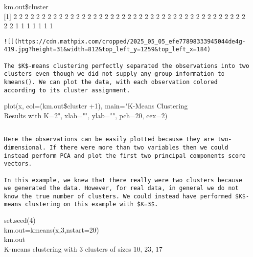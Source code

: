 \documentclass[10pt]{article}
\begin{document}
\begin{displayquote}
km.out\$cluster\\[0pt]
[1] 2 2 2 2 2 2 2 2 2 2 2 2 2 2 2 2 2 2 2 2 2 2 2 2 2 2 2 2 2 2 2 2 2 2 2 2 2 2 2 2 2 2 2 1 1 1 1 1 1 1
\end{displayquote}

\begin{verbatim}
![](https://cdn.mathpix.com/cropped/2025_05_05_efe77898333945044de4g-419.jpg?height=31&width=812&top_left_y=1259&top_left_x=184)

The $K$-means clustering perfectly separated the observations into two clusters even though we did not supply any group information to kmeans(). We can plot the data, with each observation colored according to its cluster assignment.
\end{verbatim}

\begin{displayquote}
plot(x, col=(km.out\$cluster +1), main="K-Means Clustering\\
Results with K=2", xlab="", ylab="", pch=20, cex=2)
\end{displayquote}

\begin{verbatim}

Here the observations can be easily plotted because they are two-dimensional. If there were more than two variables then we could instead perform PCA and plot the first two principal components score vectors.

In this example, we knew that there really were two clusters because we generated the data. However, for real data, in general we do not know the true number of clusters. We could instead have performed $K$-means clustering on this example with $K=3$.
\end{verbatim}

\begin{displayquote}
set.seed(4)\\
km.out=kmeans(x,3,nstart=20)\\
km.out\\
K-means clustering with 3 clusters of sizes 10, 23, 17
\end{displayquote}

\begin{verbatim}

\end{verbatim}
\end{document}
